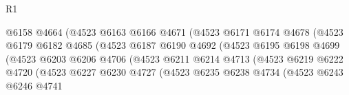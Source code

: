 \begin{lexlean}{R1}
\begin{coremodule}
                                        @6158
                                        @4664
                                        (@4523
                                          @6163
                                          @6166
                                          @4671
                                          (@4523
                                            @6171
                                            @6174
                                            @4678
                                            (@4523
                                              @6179
                                              @6182
                                              @4685
                                              (@4523
                                                @6187
                                                @6190
                                                @4692
                                                (@4523
                                                  @6195
                                                  @6198
                                                  @4699
                                                  (@4523
                                                    @6203
                                                    @6206
                                                    @4706
                                                    (@4523
                                                      @6211
                                                      @6214
                                                      @4713
                                                      (@4523
                                                        @6219
                                                        @6222
                                                        @4720
                                                        (@4523
                                                          @6227
                                                          @6230
                                                          @4727
                                                          (@4523
                                                            @6235
                                                            @6238
                                                            @4734
                                                            (@4523
                                                              @6243
                                                              @6246
                                                              @4741

\end{coremodule}
\end{lexlean}
